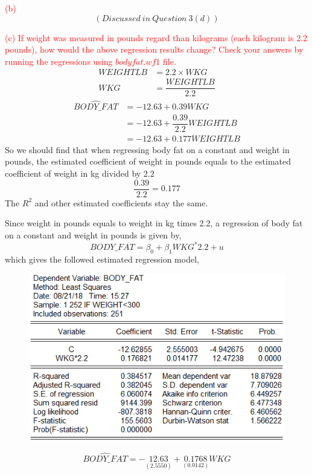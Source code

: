 \documentclass[12pt]{report}
\begin{document}
\noindent \textcolor{red}{(b)} $$(Discussed\ in\ Question\ 3(d))$$

\noindent \textcolor{red}{(c) If weight was measured in pounds regard than kilograms (each kilogram is 2.2 pounds), how would the above regression results change? Check your answers by running the regressions using $bodyfat.wf1$ file.} \begin{align*}
	WEIGHTLB &= 2.2\times WKG \\
	WKG &= \dfrac{WEIGHTLB}{2.2}  
\end{align*} 
\begin{align*}
	\widehat{BODY\_FAT} &= -12.63 + 0.39WKG \\
	&= -12.63 + \dfrac{0.39}{2.2}WEIGHTLB \\
	&= -12.63 + 0.177WEIGHTLB
\end{align*} So we should find that when regressing body fat on a constant and weight in pounds, the estimated coefficient of weight in pounds equals to the estimated coefficient of weight in kg divided by $2.2$ $$\dfrac{0.39}{2.2} = 0.177$$ The $R^2$ and other estimated coefficients stay the same.

\noindent Since weight in pounds equals to weight in kg times 2.2, a regression of body fat on a constant and weight in pounds is given by, $$BODY\_FAT = \beta_0 + \beta_1 WKG^*2.2 + u$$ which gives the followed estimated regression model,
\begin{figure}[H]
	\centerline{\includegraphics{q4_5}}
\end{figure}
\vspace{-\baselineskip} $$\widehat{BODY\_FAT} = -\underset{(2.5550)}{12.63} + \underset{(0.0142)}{0.1768} WKG$$
\end{document}
